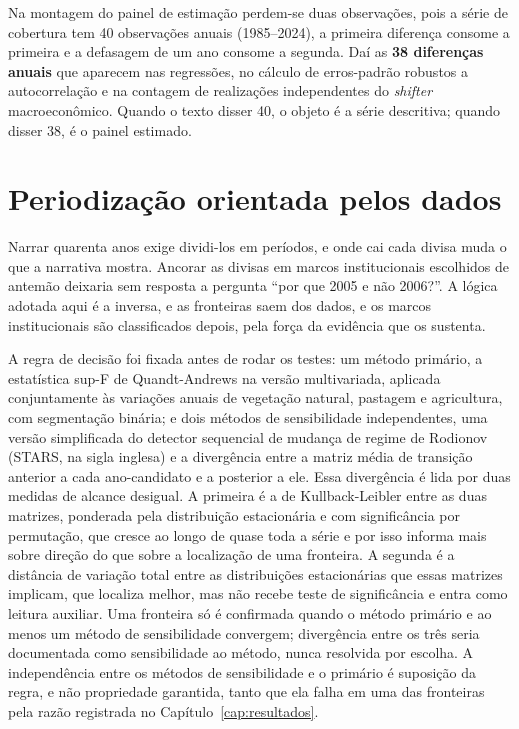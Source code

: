 Na montagem do painel de estimação perdem-se duas observações, pois a série de
cobertura tem 40 observações anuais (1985--2024), a primeira diferença
consome a primeira e a defasagem de um ano consome a segunda. Daí as
\textbf{38 diferenças anuais} que aparecem nas regressões, no cálculo de
erros-padrão robustos a autocorrelação e na contagem de realizações
independentes do \emph{shifter} macroeconômico. Quando o texto disser 40, o
objeto é a série descritiva; quando disser 38, é o painel estimado.

\section{Periodização orientada pelos dados}
\label{sec:met-periodizacao}

Narrar quarenta anos exige dividi-los em períodos, e onde cai cada divisa muda
o que a narrativa mostra. Ancorar as divisas em marcos institucionais
escolhidos de antemão deixaria sem resposta a pergunta ``por que 2005 e não
2006?''. A lógica adotada aqui é a inversa, e as fronteiras saem dos dados, e os
marcos institucionais são classificados depois, pela força da evidência que os
sustenta.

A regra de decisão foi fixada antes de rodar os testes: um método primário, a
estatística sup-F de Quandt-Andrews \cite{Quandt1960, Andrews1993} na versão
multivariada, aplicada conjuntamente às variações anuais de vegetação natural,
pastagem e agricultura, com segmentação binária; e dois métodos de
sensibilidade independentes, uma versão simplificada do detector sequencial de
mudança de regime de Rodionov (STARS, na sigla inglesa) \cite{Rodionov2004} e a
divergência entre a matriz média de transição anterior a cada ano-candidato e a
posterior a ele. Essa divergência é lida por duas medidas de alcance desigual. A
primeira é a de Kullback-Leibler entre as duas matrizes, ponderada pela
distribuição estacionária e com significância por permutação, que cresce ao
longo de quase toda a série e por isso informa mais sobre direção do que sobre a
localização de uma fronteira. A segunda é a distância de variação total entre as
distribuições estacionárias que essas matrizes implicam, que localiza melhor,
mas não recebe teste de significância e entra como leitura auxiliar. Uma
fronteira só é confirmada quando o método
primário e ao menos um método de sensibilidade convergem; divergência entre os
três seria documentada como sensibilidade ao método, nunca resolvida por
escolha. A independência entre os métodos de sensibilidade e o primário é
suposição da regra, e não propriedade garantida, tanto que ela falha em uma das
fronteiras pela razão registrada no Capítulo~\ref{cap:resultados}.

